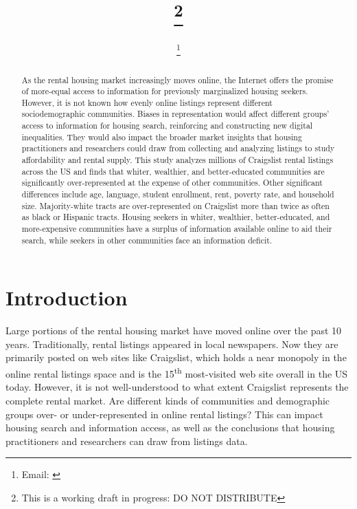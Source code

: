 \documentclass[11pt,onecolumn]{article} %
\begin{document}
	
\title{\papertitle\footnote{This is a working draft in progress: DO NOT DISTRIBUTE}}
\date{\paperdate}
\author[]{\myname \thanks{Email: \href{mailto:\myemail}{\myemail}}}
\affil[]{\myaffiliation}

\maketitle

\begin{abstract}
As the rental housing market increasingly moves online, the Internet offers the promise of more-equal access to information for previously marginalized housing seekers. However, it is not known how evenly online listings represent different sociodemographic communities. Biases in representation would affect different groups' access to information for housing search, reinforcing and constructing new digital inequalities. They would also impact the broader market insights that housing practitioners and researchers could draw from collecting and analyzing listings to study affordability and rental supply. This study analyzes millions of Craigslist rental listings across the US and finds that whiter, wealthier, and better-educated communities are significantly over-represented at the expense of other communities. Other significant differences include age, language, student enrollment, rent, poverty rate, and household size. Majority-white tracts are over-represented on Craigslist more than twice as often as black or Hispanic tracts. Housing seekers in whiter, wealthier, better-educated, and more-expensive communities have a surplus of information available online to aid their search, while seekers in other communities face an information deficit.
\vspace{1cm}
\end{abstract}




\section{Introduction}

Large portions of the rental housing market have moved online over the past 10 years. Traditionally, rental listings appeared in local newspapers. Now they are primarily posted on web sites like Craigslist, which holds a near monopoly in the online rental listings space and is the 15\textsuperscript{th} most-visited web site overall in the US today. However, it is not well-understood to what extent Craigslist represents the complete rental market. Are different kinds of communities and demographic groups over- or under-represented in online rental listings? This can impact housing search and information access, as well as the conclusions that housing practitioners and researchers can draw from listings data.
\end{document}
